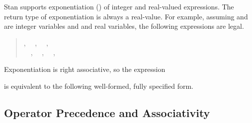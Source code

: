 Stan supports exponentiation (\code{\textasciicircum}) of integer and real-valued expressions.
The return type of exponentiation is always a real-value.
For example, assuming 
and  are integer variables and  and  real
variables, the following expressions are legal.
%
\begin{quote}
,
\ \ ,
\ \ ,
\\
\ \ ,
\ \ ,
\ \ ,
\ \ 
\end{quote}
%
Exponentiation is right associative, so the expression 
%
\begin{quote}
\end{quote}
%
is equivalent to the following well-formed, fully specified form.
%
\begin{quote}
\end{quote}
%



\subsection{Operator Precedence and Associativity}

